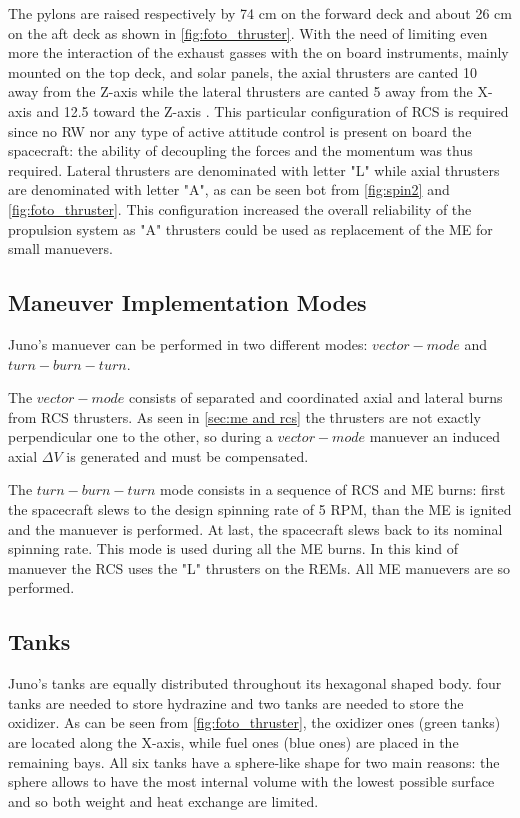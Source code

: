 
The pylons are raised respectively by 74 cm on the forward deck and about 26 cm on the aft deck as shown in \autoref{fig:foto_thruster}. With the need of limiting even more the interaction of the exhaust gasses with the on board instruments, mainly mounted on the top deck, and solar panels, the axial thrusters are canted 10\textdegree \; away from the Z-axis while the lateral thrusters are canted 5\textdegree \; away from the X-axis and 12.5\textdegree \; toward the Z-axis \cite{junno_inner}. This particular configuration of RCS is required since no RW nor any type of active attitude control is present on board the spacecraft: the ability of decoupling the forces and the momentum was thus required.
Lateral thrusters are denominated with letter "L" while axial thrusters are denominated with letter "A", as can be seen bot from \autoref{fig:spin2} and \autoref{fig:foto_thruster}. This configuration increased the overall reliability of the propulsion system as "A" thrusters could be used as replacement of the ME for small manuevers. 

\subsection{Maneuver Implementation Modes}
\label{sec: manuever implemementation modes}

Juno's manuever can be performed in two different modes: $vector-mode$ and $turn-burn-turn$. 

The $vector-mode$ consists of separated and coordinated axial and lateral burns from RCS thrusters. As seen in \autoref{sec:me and rcs} the thrusters are not exactly perpendicular one to the other, so during a $vector-mode$ manuever an induced axial $\Delta V$ is generated and must be compensated.


The $turn-burn-turn$ mode consists in a sequence of RCS and ME burns: first the spacecraft slews to the design spinning rate of 5 RPM, than the ME is ignited and the manuever is performed. At last, the spacecraft slews back to its nominal spinning rate. This mode is used during all the ME burns. In this kind of manuever the RCS uses the "L" thrusters on the REMs. All ME manuevers are so performed. 

\subsection{Tanks} 
\label{sec: tanks}
Juno's tanks are equally distributed throughout its hexagonal shaped body. four tanks are needed to store hydrazine and two tanks are needed to store the oxidizer. As can be seen from \autoref{fig:foto_thruster}, the oxidizer ones (green tanks) are located along the X-axis, while fuel ones (blue ones) are placed in the remaining bays. All six tanks have a sphere-like shape for two main reasons: the sphere allows to have the most internal volume with the lowest possible surface and so both weight and heat exchange are limited.

